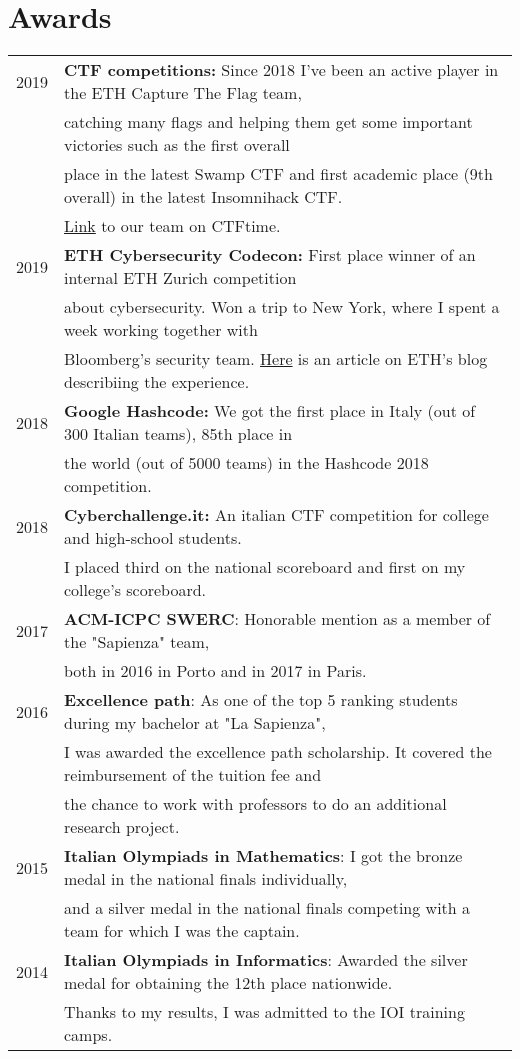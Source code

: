 \documentclass[a4paper,10pt]{article} %
\newcommand{\mh}[0]{{\hspace*{-1em}}}
\newcommand{\mH}[0]{{\hspace*{0.5em}}}
\begin{document}
\section{Awards}
\begin{tabular}{ll}
2019 \mH & \mh \textbf{CTF competitions:} Since 2018 I've been an active player in the ETH Capture The Flag team, \\
     & catching many flags and helping them get some important victories such as the first overall\\
     & place in the latest Swamp CTF and first academic place (9th overall) in the latest Insomnihack CTF.\\
     & \href{https://ctftime.org/team/34878}{Link} to our team on CTFtime.\\
2019 & \mh \textbf{ETH Cybersecurity Codecon:} First place winner of an internal ETH Zurich competition \\
     & about cybersecurity. Won a trip to New York, where I spent a week working together with \\
     & Bloomberg's security team. \href{https://blogs.ethz.ch/ETHambassadors/2019/06/27/meeting-michael-bloomberg/}{Here} is an article on ETH's blog describiing the experience.\\
2018 & \mh \textbf{Google Hashcode:} We got the first place in Italy (out of 300 Italian teams), 85th place in\\
     & the world (out of 5000 teams) in the Hashcode 2018 competition.\\
2018 & \mh \textbf{Cyberchallenge.it:} An italian CTF competition for college and high-school students.\\
     & I placed third on the national scoreboard and first on my college's scoreboard.\\
2017 & \mh \textbf{ACM-ICPC SWERC}: Honorable mention as a member of the "Sapienza" team,  \\
     & both in 2016 in Porto and in 2017 in Paris.\\
2016 & \mh \textbf{Excellence path}: As one of the top 5 ranking students during my bachelor at "La Sapienza",\\
     & I was awarded the excellence path scholarship. It covered the reimbursement of the tuition fee and \\
     & the chance to work with professors to do an additional research project. \\
2015 & \mh \textbf{Italian Olympiads in Mathematics}: I got the bronze medal in the national finals individually,\\
     & and a silver medal in the national finals competing with a team for which I was the captain. \\
2014 & \mh \textbf{Italian Olympiads in Informatics}: Awarded the silver medal for obtaining the 12th place nationwide. \\
     & Thanks to my results, I was admitted to the IOI training camps. \\
\end{tabular}
\end{document}

